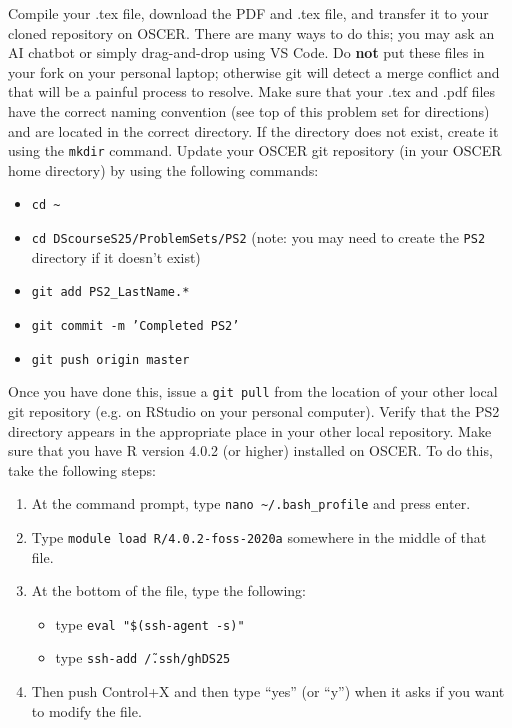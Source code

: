 \documentclass[12pt,english]{exam}
\begin{document}
\begin{questions}
\question Compile your .tex file, download the PDF and .tex file, and transfer it to your cloned repository on OSCER. There are many ways to do this;  you may ask an AI chatbot or simply drag-and-drop using VS Code. Do \textbf{not} put these files in your fork on your personal laptop; otherwise git will detect a merge conflict and that will be a painful process to resolve.
\question Make sure that your .tex and .pdf files have the correct naming convention (see top of this problem set for directions) and are located in the correct directory. If the directory does not exist, create it using the \texttt{mkdir} command.
\question Update your OSCER git repository (in your OSCER home directory) by using the following commands:
\begin{itemize}
    \item \texttt{cd \~}
    \item \texttt{cd DScourseS25/ProblemSets/PS2} (note: you may need to create the \texttt{PS2} directory if it doesn't exist)
    \item \texttt{git add PS2\_LastName.*}
    \item \texttt{git commit -m 'Completed PS2'}
    \item \texttt{git push origin master}
\end{itemize}
Once you have done this, issue a \texttt{git pull} from the location of your other local git repository (e.g. on RStudio on your personal computer). Verify that the PS2 directory appears in the appropriate place in your other local repository.
\question Make sure that you have R version 4.0.2 (or higher) installed on OSCER. To do this, take the following steps:
\begin{enumerate}
    \item At the command prompt, type \texttt{nano \textasciitilde/.bash\_profile} and press enter. 
    \item Type \texttt{module load R/4.0.2-foss-2020a} somewhere in the middle of that file. 
    \item At the bottom of the file, type the following:
        \begin{itemize}
        \item type \texttt{eval "\$(ssh-agent -s)"}
        \item type \texttt{ssh-add \~/.ssh/ghDS25}
        \end{itemize}
    \item Then push Control+X and then type ``yes'' (or ``y'') when it asks if you want to modify the file.
\end{enumerate}

\end{questions}
\end{document}
